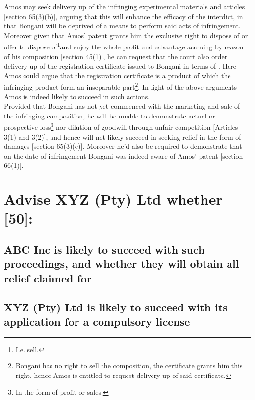 \documentclass[11pt]{article}
\begin{document}
Amos may seek delivery up of the infringing experimental materials and articles
[section 65(3)(b)]\cite{rsa78_patents_act}, arguing that this will enhance the
efficacy of the interdict, in that Bongani will be deprived of a means to
perform said acts of infringement. Moreover given that Amos' patent grants him
the exclusive right to dispose of or offer to dispose of\footnote{I.e. sell.}and
enjoy the whole profit and advantage accruing by reason of his composition
[section 45(1)]\cite{rsa78_patents_act}, he can request that the court also order
delivery up of the registration certificate issued to Bongani in terms of
\cite{rsa65_medicines_related_substances_act}. Here Amos could argue that the
registration certificate is a product of which the infringing product form an
inseparable part\footnote{Bongani has no right to sell the composition, the
certificate grants him this right, hence Amos is entitled to request delivery up
of said certificate.}. In light of the above arguments Amos is indeed likely to
succeed in such actions.\\

Provided that Bongani has not yet commenced with the marketing and sale of the
infringing composition, he will be unable to demonstrate actual or prospective loss\footnote{In the form of profit or sales.} nor
dilution of goodwill through unfair competition [Articles 3(1) and
3(2)]\cite{wipo96_model_provi_unfair_comp}, and hence will not likely
succeed in seeking relief in the form of damages [section
65(3)(c)]\cite{rsa78_patents_act}. Moreover he'd also be required to demonstrate
that on the date of infringement Bongani was indeed aware of Amos' patent
[section 66(1)]\cite{rsa78_patents_act}.
\section{Advise XYZ (Pty) Ltd whether [50]:}
\label{sec:orgba776b1}
\subsection{ABC Inc is likely to succeed with such proceedings, and whether they will obtain all relief claimed for}
\label{sec:org5accc49}
\subsection{XYZ (Pty) Ltd is likely to succeed with its application for a compulsory license}
\label{sec:org4f057f8}
\printbibliography
\end{document}
